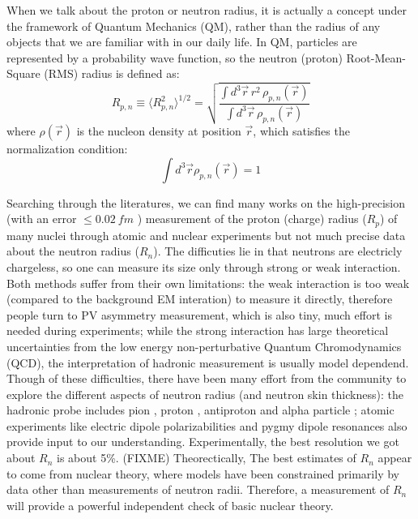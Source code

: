 When we talk about the proton or neutron radius, it is actually a concept under the
framework of Quantum Mechanics (QM), rather than the radius of any objects that we
are familiar with in our daily life. In QM, particles are represented by a probability
wave function, so the neutron (proton) Root-Mean-Square (RMS) radius is defined as:
\begin{equation}
    R_{p, n} \equiv \langle R_{p,n}^2\rangle^{1/2} = \sqrt{\frac{\int d^3\vec{r}\,r^2\,\rho_{p,n}(\vec{r})}{\int d^3\vec{r}\,\rho_{p,n}(\vec{r})}}
    \label{eqn:rms_radius}
\end{equation}
where $\rho(\vec{r})$ is the nucleon density at position $\vec{r}$, which satisfies the normalization
condition:
\begin{equation*}
    \int d^3\vec{r} \rho_{p, n}(\vec{r}) = 1 
\end{equation*}

Searching through the literatures, we can find many works on the high-precision  
(with an error $\le 0.02 \ fm$ )
measurement of the proton (charge) radius ($R_p$) of many nuclei through atomic 
and nuclear experiments \cite{DEVRIES1987495, ANGELI2004185} but not much 
precise data about the neutron radius ($R_n$). The difficuties lie in that
neutrons are electricly chargeless, so one can measure its size only through 
strong or weak interaction. Both methods suffer from their own
limitations: the weak interaction is too weak (compared to the background EM 
interation) to measure it directly, therefore people turn to PV asymmetry
measurement, which is also tiny, much effort is needed during experiments;
while the strong interaction has large theoretical uncertainties from the 
low energy non-perturbative Quantum Chromodynamics (QCD), the interpretation of
hadronic measurement is usually model dependend. Though of these
difficulties, there have been many effort from the community to explore the
different aspects of neutron radius (and neutron skin thickness): 
the hadronic probe includes pion \cite{???}, proton \cite{???}, antiproton \cite{???} 
and alpha particle \cite{???};
atomic experiments like electric dipole polarizabilities \cite{???} and 
pygmy dipole resonances \cite{???}
also provide input to our understanding.
Experimentally, the best resolution we got about $R_n$ is about 5\%. (FIXME)
Theorectically, The best estimates of $R_n$ appear to come from nuclear theory, 
where models have been constrained primarily by data other than measurements 
of neutron radii. Therefore, a measurement of $R_n$ will provide a powerful 
independent check of basic nuclear theory.

